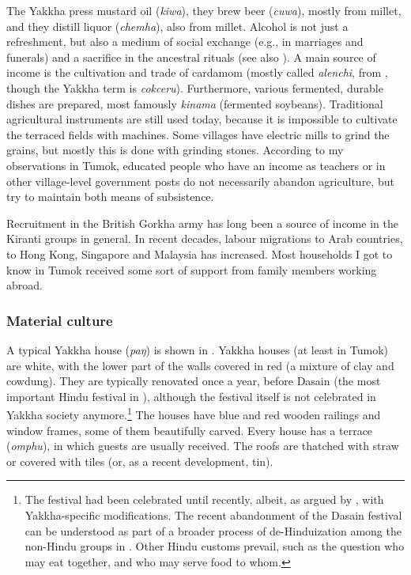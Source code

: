 The Yakkha press mustard oil (\emph{kiwa}), they brew beer (\emph{cuwa}), mostly from millet, and they distill liquor (\emph{chemha}), also from millet. Alcohol is not just a refreshment, but also a medium of social exchange (e.g., in marriages and fune\-rals) and a sacrifice in the ancestral rituals (see also \citet[124]{Russell1992_Yakha}).  A main source of income is the cultivation and trade of cardamom (mostly called \emph{alenchi}, from , though the Yakkha term is \emph{cokceru}). Furthermore, various fermented, durable dishes are prepared, most famously \emph{kinama} (fermented soybeans). Traditional agricultural instruments are still used today, because it is impossible to cultivate the terraced fields with machines. Some villages have electric mills to grind the grains, but mostly this is done with grinding stones. According to my observations in Tumok, educated people who have an income as teachers or in other village-level government posts do not necessarily abandon agriculture, but try to maintain both means of subsistence. 

Recruitment in the British Gorkha army has long been a source of income in the Kiranti groups in general. In recent decades, labour migrations to Arab countries, to Hong Kong, Singapore and Malaysia has increased. Most households I got to know in Tumok received some sort of support from family members working abroad. 


\subsubsection{Material culture}

\largerpage
A typical Yakkha house (\emph{paŋ}) is shown in . Yakkha houses (at least in Tumok) are white, with the lower part of the walls covered in red (a mixture of clay and cowdung). They are typically renovated once a year, before Dasain (the most important Hindu festival in ), although the festival itself is not celebrated in Yakkha society anymore.\footnote{The festival had been celebrated until recently, albeit, as argued by \citet{Russell2004Traditions}, with Yakkha-specific modifications. The recent abandonment of the Dasain festival can be understood as part of a broader process of de-Hinduization among the non-Hindu groups in . Other Hindu customs prevail, such as the question who may eat together, and who may serve food to whom.} The houses have blue and red wooden railings and window frames, some of them beautifully carved. Every house has a terrace (\emph{omphu}), in which guests are usually received. The roofs are thatched with straw or covered with tiles (or, as a recent development, tin).

